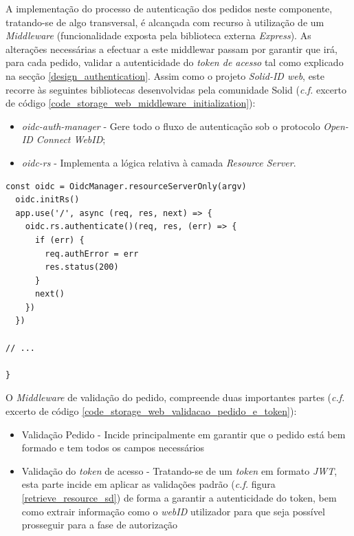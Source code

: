 A implementação do processo de autenticação dos pedidos neste componente, tratando-se de algo transversal, é alcançada com recurso à utilização de um \emph{Middleware} (funcionalidade exposta pela biblioteca externa \emph{Express}). As alterações necessárias a efectuar a este middlewar passam por garantir que irá, para cada pedido, validar a autenticidade do \emph{token de acesso} tal como explicado na secção \ref{design_authentication}.
Assim como o projeto \emph{Solid-ID web}, este recorre às seguintes bibliotecas desenvolvidas pela comunidade Solid (\emph{c.f.} excerto de código \ref{code_storage_web_middleware_initialization}):
\begin{itemize}
    \item \emph{oidc-auth-manager} - Gere todo o fluxo de autenticação sob o protocolo \emph{Open-ID Connect WebID};
    \item \emph{oidc-rs} - Implementa a lógica relativa à camada \emph{Resource Server}.
\end{itemize}

\begin{lstlisting}[caption={Inicialização do \emph{Middleware} de autenticação de pedidos \emph{\acrshort{REST}}}, label={code_storage_web_middleware_initialization}]
  const oidc = OidcManager.resourceServerOnly(argv)
  oidc.initRs()
  app.use('/', async (req, res, next) => {
    oidc.rs.authenticate()(req, res, (err) => {
      if (err) {
        req.authError = err
        res.status(200)
      }
      next()
    })
  })

// ...

}

\end{lstlisting}

O \emph{Middleware} de validação do pedido, compreende duas importantes partes (\emph{c.f.} excerto de código \ref{code_storage_web_validacao_pedido_e_token}):
\begin{itemize}
    \item Validação Pedido - Incide principalmente em garantir que o pedido está bem formado e tem todos os campos necessários
    \item Validação do \emph{token} de acesso - Tratando-se de um \emph{token} em formato \emph{\acrshort{JWT}}, esta parte incide em aplicar as validações padrão (\emph{c.f.} figura \ref{retrieve_resource_sd}) de forma a garantir a autenticidade do token, bem como extrair informação como o \emph{webID} utilizador para que seja possível prosseguir para a fase de autorização
\end{itemize}

